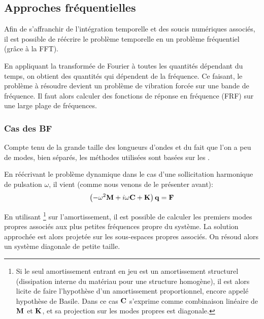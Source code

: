 \medskip
\subsection{Approches fréquentielles}

Afin de s'affranchir de l'intégration temporelle et des soucis numériques associés, il est
possible de réécrire le problème temporelle en un problème fréquentiel (grâce à 
la FFT).


\medskip
En appliquant la transformée de Fourier
à toutes les quantités dépendant du temps,
on obtient des quantités qui dépendent de la fréquence.
Ce faisant, le problème à résoudre devient un problème de vibration
forcée sur une bande de fréquence.
Il faut alors calculer des fonctions de réponse en fréquence (FRF) sur une large plage
de fréquences.

\medskip
\subsubsection{Cas des BF}

Compte tenu de la grande taille des longueurs d'ondes et du fait que l'on a peu de modes, bien séparés,
les méthodes utilisées sont basées sur les .

En réécrivant le problème dynamique dans le cas d'une sollicitation harmonique de pulsation
$\omega$, il vient (comme nous venons de le présenter avant):
\begin{equation}
\left(-\omega^2\mathbf{M}+i\omega \mathbf{C}+\mathbf{K}\right)\mathbf{q} = \mathbf{F}
\end{equation}

En utilisant \footnote{%
Si le seul amortissement entrant en jeu est un amortissement structurel (dissipation
interne du matériau pour une structure homogène), il est alors licite de faire
l'hypothèse d'un amortissement proportionnel, encore appelé hypothèse de
Basile. Dans ce cas $\mathbf{C}$ s'exprime comme combinaison linéaire de $\mathbf{M}$ et $\mathbf{K}$,
et sa projection sur les modes propres est diagonale.
} sur l'amortissement, il est possible de calculer les premiers modes propres 
associés aux plus petites fréquences propre du système.
La solution approchée est alors projetée sur les sous-espaces propres associés.
On résoud alors un système diagonale de petite taille.

